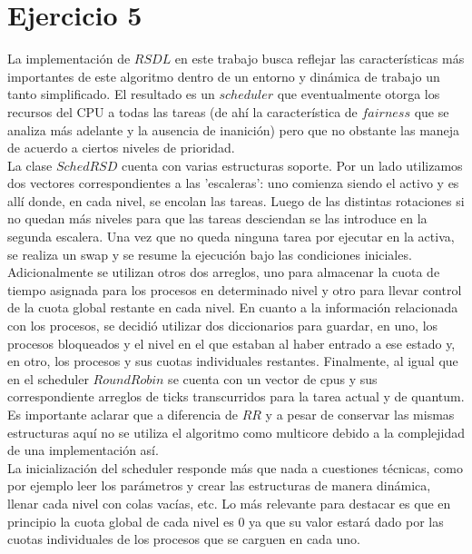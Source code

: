 \section{Ejercicio 5}

La implementación de $RSDL$ en este trabajo busca reflejar las características más importantes de este algoritmo dentro de un entorno y dinámica de trabajo un tanto simplificado. El resultado es un $scheduler$ que eventualmente otorga los recursos del CPU a todas las tareas (de ahí la característica de $fairness$ que se analiza más adelante y la ausencia de inanición) pero que no obstante las maneja de acuerdo a ciertos niveles de prioridad.\\
\indent La clase $SchedRSD$ cuenta con varias estructuras soporte. Por un lado utilizamos dos vectores correspondientes a las 'escaleras': uno comienza siendo el activo y es allí donde, en cada nivel, se encolan las tareas. Luego de las distintas rotaciones si no quedan más niveles para que las tareas desciendan se las introduce en la segunda escalera. Una vez que no queda ninguna tarea por ejecutar en la activa, se realiza un swap y se resume la ejecución bajo las condiciones iniciales. Adicionalmente se utilizan otros dos arreglos, uno para almacenar la cuota de tiempo asignada para los procesos en determinado nivel y otro para llevar control de la cuota global restante en cada nivel. En cuanto a la información relacionada con los procesos, se decidió utilizar dos diccionarios para guardar, en uno, los procesos bloqueados y el nivel en el que estaban al haber entrado a ese estado y, en otro, los procesos y sus cuotas individuales restantes. Finalmente, al igual que en el scheduler $Round Robin$ se cuenta con un vector de cpus y sus correspondiente arreglos de ticks transcurridos para la tarea actual y de quantum. Es importante aclarar que a diferencia de $RR$ y a pesar de conservar las mismas estructuras aquí no se utiliza el algoritmo como multicore debido a la complejidad de una implementación así.\\
\indent La inicialización del scheduler responde más que nada a cuestiones técnicas, como por ejemplo leer los parámetros y crear las estructuras de manera dinámica, llenar cada nivel con colas vacías, etc. Lo más relevante para destacar es que en principio la cuota global de cada nivel es $0$ ya que su valor estará dado por las cuotas individuales de los procesos que se carguen en cada uno. \\
